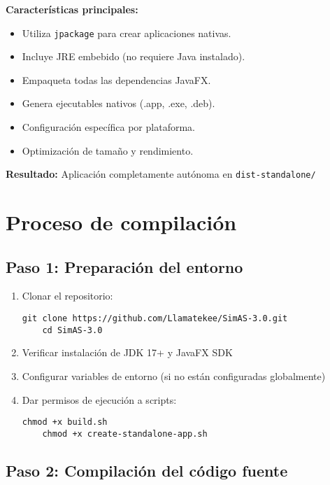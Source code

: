 \textbf{Características principales:}

\begin{itemize}
    \item Utiliza \texttt{jpackage} para crear aplicaciones nativas.
    \item Incluye JRE embebido (no requiere Java instalado).
    \item Empaqueta todas las dependencias JavaFX.
    \item Genera ejecutables nativos (.app, .exe, .deb).
    \item Configuración específica por plataforma.
    \item Optimización de tamaño y rendimiento.
\end{itemize}

\textbf{Resultado:} Aplicación completamente autónoma en \texttt{dist-standalone/}

\section{Proceso de compilación}

\subsection{Paso 1: Preparación del entorno}

\begin{enumerate}
    \item Clonar el repositorio:
    \begin{lstlisting}[]
    git clone https://github.com/Llamatekee/SimAS-3.0.git
    cd SimAS-3.0
    \end{lstlisting}

    \item Verificar instalación de JDK 17+ y JavaFX SDK
    \item Configurar variables de entorno (si no están configuradas globalmente)
    \item Dar permisos de ejecución a scripts:
    \begin{lstlisting}[]
    chmod +x build.sh
    chmod +x create-standalone-app.sh
    \end{lstlisting}
\end{enumerate}

\subsection{Paso 2: Compilación del código fuente}

